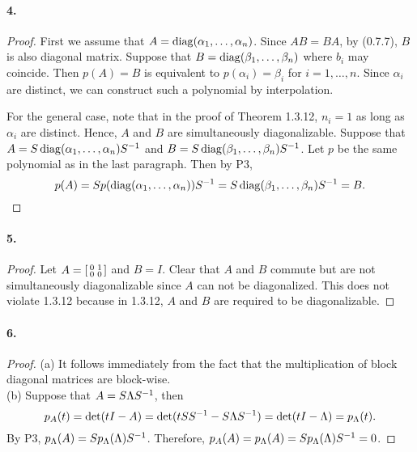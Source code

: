   \paragraph{4.}
  \begin{proof}
    First we assume that $A=\operatorname{diag}(\alpha_1,\dots,\alpha_n)$. Since $AB=BA$, by
    (0.7.7), $B$ is also diagonal matrix. Suppose that $B=\operatorname{diag}(\beta_1,\dots,
    \beta_n)$ where $b_i$ may coincide. Then $p(A)=B$ is equivalent to 
    $p(\alpha_i)=\beta_i$ for $i=1,\dots,n$. Since $\alpha_i$ are distinct, we 
    can construct such a polynomial by interpolation.\par
    For the general case, note that in the proof of Theorem 1.3.12, $n_i=1$ as
    long as $\alpha_i$ are distinct. Hence, $A$ and $B$ are simultaneously 
    diagonalizable. Suppose that $A=S\operatorname{diag}(\alpha_1,\dots,\alpha_n)S^{-1}$ and
    $B=S\operatorname{diag}(\beta_1,\dots,\beta_n)S^{-1}$. Let $p$ be the same polynomial as in
    the last paragraph. Then by P3,
    \[
      p(A)=Sp(\operatorname{diag}(\alpha_1,\dots,\alpha_n))S^{-1} = 
      S\operatorname{diag}(\beta_1,\dots,\beta_n)S^{-1} = B.
    \]
  \end{proof}

  \paragraph{5.}
  \begin{proof}
    Let $A=\begin{bsmallmatrix} 0 & 1 \\ 0 & 0\end{bsmallmatrix}$ and $B=I$.
    Clear that $A$ and $B$ commute but are not simultaneously diagonalizable 
    since $A$ can not be diagonalized. This does not violate 1.3.12 because
    in 1.3.12, $A$ and $B$ are required to be diagonalizable.
  \end{proof}

  \paragraph{6.}
  \begin{proof}
    (a) It follows immediately from the fact that the multiplication of block
    diagonal matrices are block-wise.\\
    (b) Suppose that $A=S\Lambda S^{-1}$, then
    \[
      p_A(t)=\det(tI-A)=\det(tSS^{-1} - S\Lambda S^{-1}) = \det(tI-\Lambda)=
      p_\Lambda(t).
    \]
    By P3, $p_\Lambda(A)=Sp_\Lambda(\Lambda)S^{-1}$. Therefore, $p_A(A)=p_\Lambda
    (A)=Sp_\Lambda(\Lambda)S^{-1}=0$.
  \end{proof}

